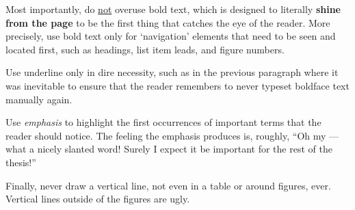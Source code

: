 Most importantly, do \underline{not} overuse bold text, which is designed to literally \textbf{shine from the page} to be the first thing that catches the eye of the reader. More precisely, use bold text only for `navigation' elements that need to be seen and located first, such as headings, list item leads, and figure numbers.

Use underline only in dire necessity, such as in the previous paragraph where it was inevitable to ensure that the reader remembers to never typeset boldface text manually again.

Use \emph{emphasis} to highlight the first occurrences of important terms that the reader should notice. The feeling the emphasis produces is, roughly, ``Oh my --- what a nicely slanted word! Surely I expect it be important for the rest of the thesis!''

Finally, never draw a vertical line, not even in a table or around figures, ever. Vertical lines outside of the figures are ugly.
